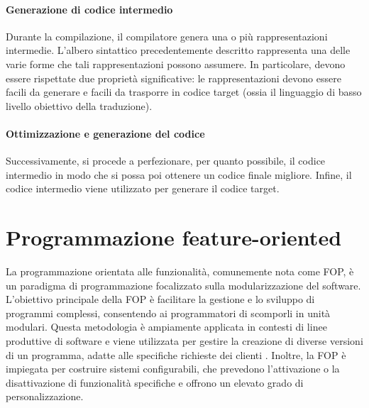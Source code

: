 \documentclass[12pt,a4paper,openright,twoside]{book}
\begin{document}
\paragraph{Generazione di codice intermedio}
Durante la compilazione, il compilatore genera una o più rappresentazioni intermedie. 
L'albero sintattico precedentemente descritto rappresenta una delle varie forme che tali rappresentazioni possono assumere. In particolare, 
devono essere rispettate due proprietà significative: le rappresentazioni devono essere facili da generare e facili da trasporre in codice 
target (ossia il linguaggio di basso livello obiettivo della traduzione).

\paragraph{Ottimizzazione e generazione del codice}
Successivamente, si procede a perfezionare, per quanto possibile, il codice intermedio in modo 
che si possa poi ottenere un codice finale migliore. Infine, il codice intermedio viene utilizzato per generare il codice target.

\section{Programmazione feature-oriented}
La programmazione orientata alle funzionalità, comunemente nota come \ac{FOP}, è un paradigma di programmazione focalizzato sulla modularizzazione 
del software. L’obiettivo principale della \ac{FOP} è facilitare la gestione e lo sviluppo di programmi complessi, consentendo ai programmatori 
di scomporli in unità modulari. Questa metodologia è ampiamente applicata in contesti di linee produttive di software e viene utilizzata per 
gestire la creazione di diverse versioni di un programma, adatte alle specifiche richieste dei clienti \cite{Apel2013}. Inoltre, la \ac{FOP} è 
impiegata per costruire sistemi configurabili, che prevedono l’attivazione o la disattivazione di funzionalità specifiche e offrono un elevato 
grado di personalizzazione.
\end{document}
